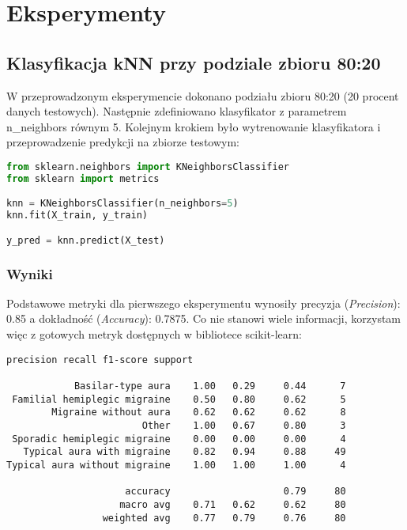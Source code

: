\section{Eksperymenty}
\subsection{Klasyfikacja kNN przy podziale zbioru 80:20}
W przeprowadzonym eksperymencie dokonano podziału zbioru 80:20 (20 procent danych testowych). Następnie zdefiniowano klasyfikator z parametrem n\_neighbors równym 5. Kolejnym krokiem było wytrenowanie klasyfikatora i przeprowadzenie predykcji na zbiorze testowym:\\

\begin{lstlisting}[language=Python, caption=Definicja i uzycie kNN]
from sklearn.neighbors import KNeighborsClassifier
from sklearn import metrics

knn = KNeighborsClassifier(n_neighbors=5)
knn.fit(X_train, y_train)

y_pred = knn.predict(X_test)
\end{lstlisting}

\subsubsection{Wyniki}
Podstawowe metryki dla pierwszego eksperymentu wynosiły precyzja (\textit{Precision}): 0.85 a dokładność (\textit{Accuracy}): 0.7875. Co nie stanowi wiele informacji, korzystam więc z gotowych metryk dostępnych w bibliotece scikit-learn:\\

\begin{lstlisting}[caption=Szczegółowa tabela walidacji]
                            precision recall f1-score support

            Basilar-type aura    1.00   0.29     0.44      7
 Familial hemiplegic migraine    0.50   0.80     0.62      5
        Migraine without aura    0.62   0.62     0.62      8
                        Other    1.00   0.67     0.80      3
 Sporadic hemiplegic migraine    0.00   0.00     0.00      4
   Typical aura with migraine    0.82   0.94     0.88     49
Typical aura without migraine    1.00   1.00     1.00      4

                     accuracy                    0.79     80
                    macro avg    0.71   0.62     0.62     80
                 weighted avg    0.77   0.79     0.76     80
\end{lstlisting}

